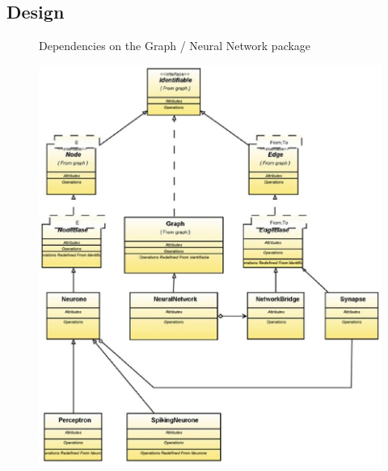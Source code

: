 \documentclass{acm_proc_article-sp}
\begin{document}
\subsection{Design}
{
\begin{figure}[t]
\centering
{}
\caption{Dependencies on the Graph / Neural Network package}
\label{fig:neural:dependencies}
\end{figure}
\begin{figure}[t]
\centering
\scalebox{0.4} {
	\includegraphics{NeuralUML}
}
\end{figure}}
\end{document}

